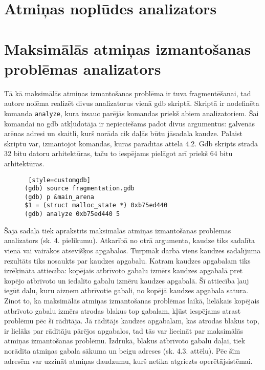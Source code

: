 \section{Atmiņas noplūdes analizators}

\section{Maksimālās atmiņas izmantošanas problēmas analizators}
Tā kā maksimālās atmiņas izmantošanas problēma ir tuva fragmentēšanai, tad autore nolēma realizēt divus analizatorus vienā gdb skriptā.
Skriptā ir nodefinēta komanda \texttt{analyze}, kura izsauc parējās komandas priekš abiem analizatoriem.
Šai komandai no gdb atkļūdotāja ir nepieciešams padot divus argumentus: galvenās arēnas adresi un skaitli, kurš norāda cik daļās būtu jāsadala kaudze.
Palaist skriptu var, izmantojot komandas, kuras parādītas attēlā 4.2. 
Gdb skripts stradā 32 bitu datoru arhitektūras, taču to iespējams pielāgot arī priekš 64 bitu arhitektūras.

\begin{figure}[h]
\begin{lstlisting} [style=customgdb]
(gdb) source fragmentation.gdb 
(gdb) p &main_arena 
$1 = (struct malloc_state *) 0xb75ed440
(gdb) analyze 0xb75ed440 5
\end{lstlisting}
\caption{\textbf{\fontsize{11}{12}\selectfont {Gdb skripta palaišana}}}
\end{figure} %


Šajā sadaļā tiek aprakstīts maksimālās atmiņas izmantošanas problēmas analizators (sk. 4. pielikumu).
Atkarībā no otrā argumenta, kaudze tiks sadalīta vienā vai vairākos atsevišķos apgabalos.
Turpmāk darbā viens kaudzes sadalījuma rezultāts tiks nosaukts par kaudzes apgabalu.
Katram kaudzes apgabalam tiks izrēķināta attiecība: kopējais atbrīvoto gabalu izmērs kaudzes apgabalā pret kopējo atbrīvoto un iedalīto gabalu izmēru kaudzes apgabalā.
Šī attiecība ļauj iegūt daļu, kuru aizņem atbrīvotie gabali, no kopējā kaudzes apgabala satura.
Zinot to, ka maksimālās atmiņas izmantošanas problēmas laikā, lielākais kopējais atbrīvoto gabalu izmērs atrodas blakus top gabalam, kļūst iespējams atrast problēmu pēc šī rādītāja.
Jā rādītājs kaudzes apgabalam, kas atrodas blakus top, ir lielāks par rādītāju pārējos apgabalos, tad tās var liecināt par maksimālās atmiņas izmantošanas problēmu.
Izdrukā, blakus atbrīvoto gabalu daļai, tiek norādīta atmiņas gabala sākuma un beigu adreses (sk. 4.3. attēlu).
Pēc šīm adresēm var uzzināt atmiņas daudzumu, kurš netika atgriezts operētājsistēmai.

